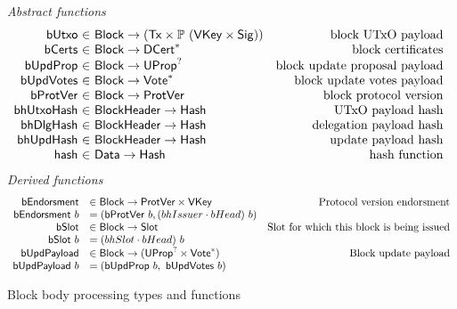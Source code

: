 \documentclass[11pt,a4paper]{article}
\newcommand{\powerset}[1]{\mathbb{P}~#1}
\newcommand{\fun}[1]{\mathsf{#1}}
\newcommand{\type}[1]{\mathsf{#1}}
\newcommand{\seqof}[1]{#1^{*}}
\newcommand{\totalf}{\to}
\newcommand{\Hash}{\type{Hash}}  %
\newcommand{\Slot}{\type{Slot}}
\newcommand{\Block}{\type{Block}}
\newcommand{\DCert}{\type{DCert}}
\newcommand{\Tx}{\type{Tx}}
\newcommand{\VKey}{\type{VKey}}
\newcommand{\Sig}{\type{Sig}}
\newcommand{\bcertsname}{bCerts}
\newcommand{\bhissuername}{bhIssuer}
\begin{document}
\begin{figure}[ht]
  \emph{Abstract functions}
  \begin{equation*}
    \begin{array}{r@{~\in~}lr}
      \fun{bUtxo} & \Block \totalf (\Tx \times \powerset{(\VKey \times \Sig)}) & \text{block UTxO payload} \\
      \fun{\bcertsname} & \Block \totalf \seqof{\DCert}
                                         & \text{block certificates} \\
      \fun{bUpdProp} & \Block \totalf \UProp^{?} & \text{block update proposal payload} \\
      \fun{bUpdVotes} & \Block \totalf \seqof{\Vote} & \text{block update votes payload} \\
      \fun{bProtVer} & \Block \totalf \ProtVer & \text{block protocol version} \\
      \fun{bhUtxoHash} & \Bhead \totalf \Hash & \text{UTxO payload hash} \\
      \fun{bhDlgHash} & \Bhead \totalf \Hash & \text{delegation payload hash} \\
      \fun{bhUpdHash} & \Bhead \totalf \Hash & \text{update payload hash} \\
      \fun{hash} & \type{Data} \totalf \Hash & \text{hash function} \\
    \end{array}
  \end{equation*}
  \emph{Derived functions}
  \begin{equation*}
    \begin{array}{rlr}
      \fun{bEndorsment} & \in \Block \to \ProtVer \times \VKey & \text{Protocol version endorsment} \\
      \bendorsment{b} & = (\bprotver{b}, (\bhissuername \cdot \bheadname) ~ b)\\
      \fun{\bslotname} & \in \Block \to \Slot & \text{Slot for which this block is being issued} \\
      \bslot{b} & = (\bhslotname \cdot \bheadname)~b \\
      \fun{\bupdpayloadname} & \in \Block \to (\UProp^{?}\times\seqof{\Vote}) & \text{Block update payload} \\
      \bupdpayload{b} & = (\bupdprop{b},~\bupdvotes{b})
    \end{array}
  \end{equation*}
  \caption{Block body processing types and functions}
  \label{fig:defs:bbody}
\end{figure}
\end{document}

